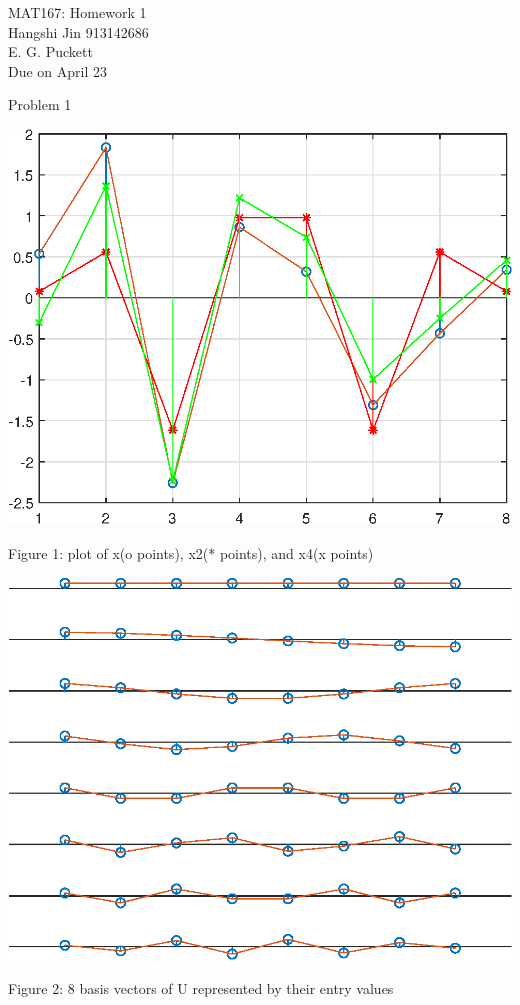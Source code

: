 \documentclass{article}
\begin{document}
\begin{flushright}MAT167: Homework 1\\ Hangshi Jin 913142686\\ E. G. Puckett\\Due on April 23
\end{flushright}
\begin{large}Problem 1\end{large}
\begin{center}
   \includegraphics[scale=1]{Figure1.eps}
   \begin{center}Figure 1: plot of x(o points), x2(* points), and x4(x points)\end{center}
   \includegraphics[scale=1]{Figure2.eps}
   \begin{center}Figure 2: 8 basis vectors of U represented by their entry values\end{center}
\end{center}
\end{document}
